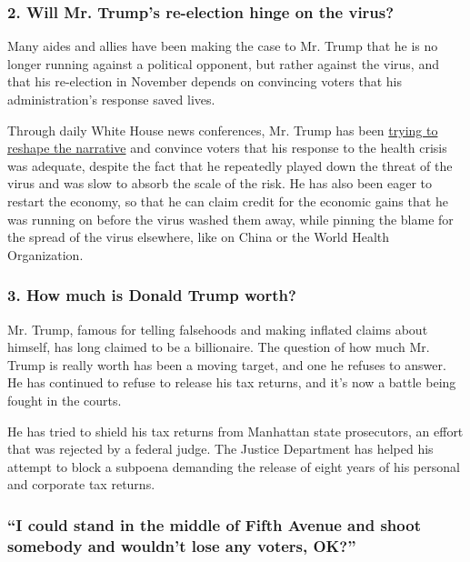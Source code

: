 \hypertarget{2-will-mr-trumps-re-election-hinge-on-the-virus}{%
\subsubsection{\texorpdfstring{\textbf{2. Will Mr. Trump's re-election
hinge on the
virus?}}{2. Will Mr. Trump's re-election hinge on the virus?}}\label{2-will-mr-trumps-re-election-hinge-on-the-virus}}

Many aides and allies have been making the case to Mr. Trump that he is
no longer running against a political opponent, but rather against the
virus, and that his re-election in November depends on convincing voters
that his administration's response saved lives.

Through daily White House news conferences, Mr. Trump has been
\href{https://www.nytimes3xbfgragh.onion/interactive/2020/04/26/us/politics/trump-coronavirus-briefings-analyzed.html}{trying
to reshape the narrative} and convince voters that his response to the
health crisis was adequate, despite the fact that he repeatedly played
down the threat of the virus and was slow to absorb the scale of the
risk. He has also been eager to restart the economy, so that he can
claim credit for the economic gains that he was running on before the
virus washed them away, while pinning the blame for the spread of the
virus elsewhere, like on China or the World Health Organization.

\hypertarget{3-how-much-is-donald-trump-worth}{%
\subsubsection{\texorpdfstring{\textbf{3. How much is Donald Trump
worth?}}{3. How much is Donald Trump worth?}}\label{3-how-much-is-donald-trump-worth}}

Mr. Trump, famous for telling falsehoods and making inflated claims
about himself, has long claimed to be a billionaire. The question of how
much Mr. Trump is really worth has been a moving target, and one he
refuses to answer. He has continued to refuse to release his tax
returns, and it's now a battle being fought in the courts.

He has tried to shield his tax returns from Manhattan state prosecutors,
an effort that was rejected by a federal judge. The Justice Department
has helped his attempt to block a subpoena demanding the release of
eight years of his personal and corporate tax returns.

\hypertarget{i-could-stand-in-the-middle-of-fifth-avenue-and-shoot-somebody-and-wouldnt-lose-any-voters-ok}{%
\subsubsection{``I could stand in the middle of Fifth Avenue and shoot
somebody and wouldn't lose any voters,
OK?''}\label{i-could-stand-in-the-middle-of-fifth-avenue-and-shoot-somebody-and-wouldnt-lose-any-voters-ok}}

